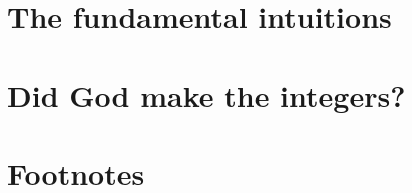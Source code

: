 \documentclass{article}
\begin{document}
\section{The fundamental intuitions}



\section{Did God make the integers?}
\section*{Footnotes}
\end{document}
